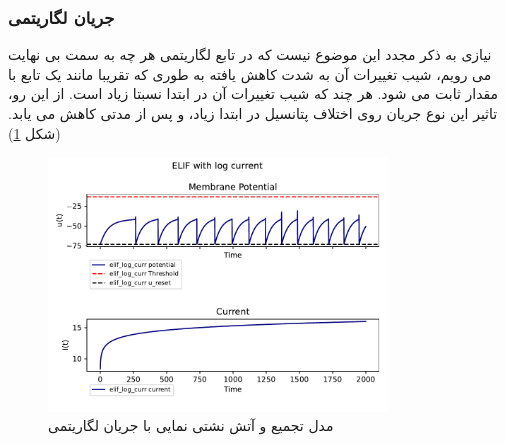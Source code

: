 \documentclass{article}
\begin{document}
            \subsubsection{جریان لگاریتمی}
                نیازی به ذکر مجدد این موضوع نیست که در تابع لگاریتمی هر چه به سمت بی نهایت می رویم، شیب تغییرات آن به شدت کاهش یافته به طوری که تقریبا مانند یک تابع با مقدار ثابت می شود. هر چند که شیب تغییرات آن در ابتدا نسبتا زیاد است. از این رو، تاثیر این نوع جریان روی اختلاف پتانسیل در ابتدا زیاد، و پس از مدتی کاهش می یابد.
                (شکل \ref{fig:elif-ramp-curr})
                \begin{figure}[H]
                    \centering
                    \includegraphics[width=0.8\textwidth]{plots/ELIF with log current.pdf} 
                    \caption{مدل تجمیع و آتش نشتی نمایی با جریان لگاریتمی}
                    \label{fig:elif-ramp-curr}
                \end{figure}
\end{document}
